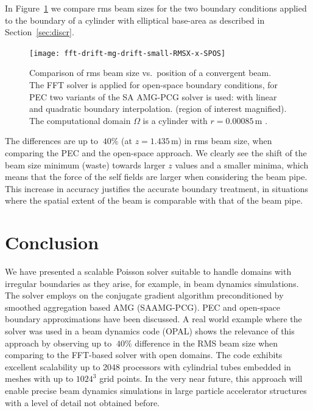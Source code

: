 \documentclass[a4paper,10pt,3p,preprint,pdftex]{elsarticle}
\begin{document}
In Figure~\ref{fig:vareps} we compare rms beam sizes for the two
boundary conditions applied to the boundary of a cylinder with
elliptical base-area as described in Section~\ref{sec:discr}.

\begin{figure}[ht]
  \begin{center}
    \texttt{[image: fft-drift-mg-drift-small-RMSX-x-SPOS]}
    \caption{Comparison of rms beam size vs.\ position of a convergent beam. The FFT solver is applied for open-space boundary conditions, for
      PEC two variants of the SA AMG-PCG solver is used: with linear and quadratic boundary interpolation. 
      (region of interest magnified). The
      computational domain $\Omega$ is a cylinder with
      $r=0.00085$\,m \label{fig:vareps}. }
  \end{center} 
\end{figure}


The differences are up to $~40\%$ (at $z=1.435$\,m) in rms beam size, when comparing the PEC and the open-space approach. We clearly see
the shift of the beam size minimum (waste) towards larger $z$ values and
a smaller minima, which means that the force of the self fields are
larger when considering the beam pipe.
This increase in accuracy justifies the 
accurate boundary treatment, in situations where the spatial extent of
the beam is comparable with that of the beam pipe.




%
\section{Conclusion}
\label{sec:concl}

We have presented a scalable Poisson solver suitable to handle domains
with irregular boundaries as they arise, for example, in beam dynamics
simulations.  The solver employs on the conjugate gradient algorithm
preconditioned by smoothed aggregation based AMG (SAAMG-PCG).  PEC and
open-space boundary approximations have been discussed.  A real world
example where the solver was used in a beam dynamics code (OPAL) shows
the relevance of this approach by observing up to $~40\%$ difference in
the RMS beam size when comparing to the FFT-based solver with open
domains.  The code exhibits excellent scalability up to 2048 processors
with cylindrial tubes embedded in meshes with up to $1024^3$ grid
points.  In the very near future, this approach will enable precise beam
dynamics simulations in large particle accelerator structures with a
level of detail not obtained before.
\end{document}
